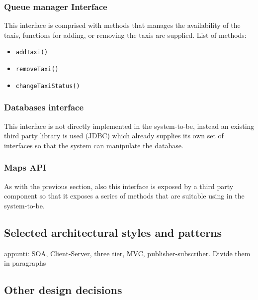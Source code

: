 \subsubsection{Queue manager Interface}
This interface is comprised with methods that manages the availability of the taxis, functions for adding, or removing the taxis are supplied. \newline
List of methods:
\begin{itemize}
	\item \texttt{addTaxi()}
	\item \texttt{removeTaxi()}
	\item \texttt{changeTaxiStatus()}
\end{itemize}
\subsubsection{Databases interface}
This interface is not directly implemented in the system-to-be, instead an existing third party library is used (JDBC) which already supplies its own set of interfaces so that the system can manipulate the database.
\subsubsection{Maps API}
As with the previous section, also this interface is exposed by a third party component so that it exposes a series of methods that are suitable using in the system-to-be.
\subsection{Selected architectural styles and patterns}
\label{sec:arch-styles-patterns}
appunti: SOA, Client-Server, three tier, MVC, publisher-subscriber. Divide them in paragraphs
\subsection{Other design decisions}
